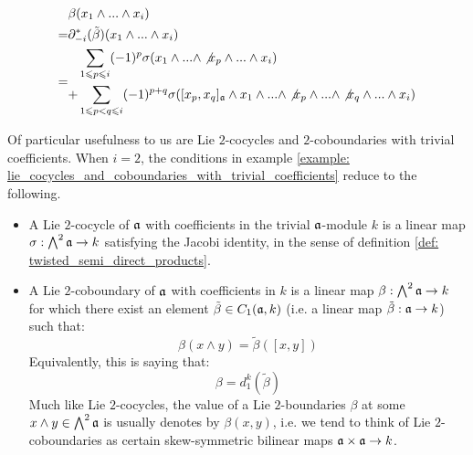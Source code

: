 \begin{example}
\begin{itemize}
                    $$
                        \begin{aligned}
                            & \beta(x_1 \wedge ... \wedge x_i)
                            \\
                            = & \partial_{-i}^*(\tilde{\beta})(x_1 \wedge ... \wedge x_i)
                            \\
                            = &
                            \begin{aligned}
                                & \sum_{1 \leqslant p \leqslant i} (-1)^p \sigma(x_1 \wedge ... \wedge \not{x_p} \wedge ... \wedge x_i)
                                \\
                                + & \sum_{1 \leqslant p < q \leqslant i} (-1)^{p + q} \sigma( [x_p, x_q]_{\mathfrak{a}} \wedge x_1 \wedge ... \wedge \not{x_p} \wedge ... \wedge \not{x_q} \wedge ... \wedge x_i)
                            \end{aligned}
                        \end{aligned}
                    $$
            \end{itemize}
        \end{example}
        \begin{example} \label{example: low_degree_lie_cocycles_and_coboundaries_with_trivial_coefficients}
            Of particular usefulness to us are Lie $2$-cocycles and $2$-coboundaries with trivial coefficients. When $i = 2$, the conditions in example \ref{example: lie_cocycles_and_coboundaries_with_trivial_coefficients} reduce to the following.
            \begin{itemize}
                \item A Lie $2$-cocycle of $\mathfrak{a}$ with coefficients in the trivial $\mathfrak{a}$-module $k$ is a linear map $\sigma: \bigwedge^2 \mathfrak{a} \to k$ satisfying the Jacobi identity, in the sense of definition \ref{def: twisted_semi_direct_products}.
                \item A Lie $2$-coboundary of $\mathfrak{a}$ with coefficients in $k$ is a linear map $\beta: \bigwedge^2 \mathfrak{a} \to k$ for which there exist an element $\tilde{\beta} \in C_1(\mathfrak{a}, k)$ (i.e. a linear map $\tilde{\beta}: \mathfrak{a} \to k$) such that:
                    $$\beta(x \wedge y) = \tilde{\beta}([x, y])$$
                Equivalently, this is saying that:
                    $$\beta = d_1^k(\tilde{\beta})$$
                Much like Lie $2$-cocycles, the value of a Lie $2$-boundaries $\beta$ at some $x \wedge y \in \bigwedge^2 \mathfrak{a}$ is usually denotes by $\beta(x, y)$, i.e. we tend to think of Lie $2$-coboundaries as certain skew-symmetric bilinear maps $\a \x \a \to k$.
            \end{itemize}
        \end{example}
